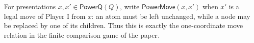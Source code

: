 \begin{definition}
For presentations $x,x'\in\mathsf{PowerQ}(Q)$, write
$\mathsf{PowerMove}(x,x')$ when $x'$ is a legal move of Player I from $x$:
an atom must be left unchanged, while a node may be replaced by one of its
children.  Thus this is exactly the one-coordinate move relation in the
finite comparison game of the paper.
\end{definition}
